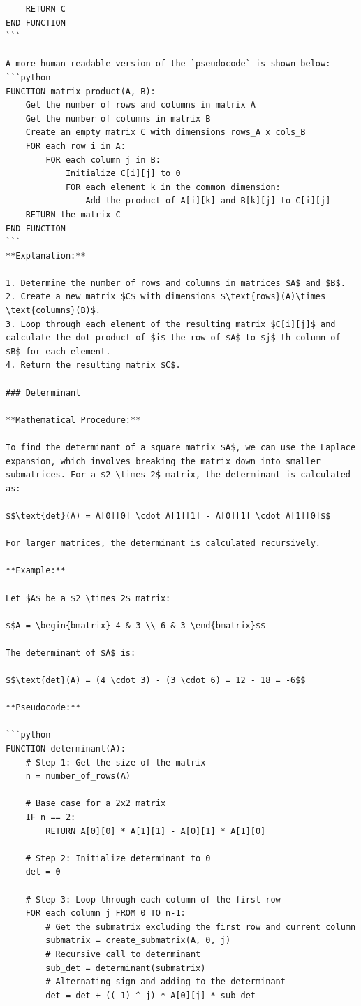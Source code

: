 \documentclass[
  letterpaper,
  DIV=11,
  numbers=noendperiod]{scrreprt}
\theoremstyle{plain}
\theoremstyle{definition}
\theoremstyle{remark}
\begin{document}
\begin{verbatim}
    RETURN C
END FUNCTION
```

A more human readable version of the `pseudocode` is shown below:
```python
FUNCTION matrix_product(A, B):
    Get the number of rows and columns in matrix A
    Get the number of columns in matrix B
    Create an empty matrix C with dimensions rows_A x cols_B
    FOR each row i in A:
        FOR each column j in B:
            Initialize C[i][j] to 0
            FOR each element k in the common dimension:
                Add the product of A[i][k] and B[k][j] to C[i][j]
    RETURN the matrix C
END FUNCTION
```
**Explanation:**

1. Determine the number of rows and columns in matrices $A$ and $B$.
2. Create a new matrix $C$ with dimensions $\text{rows}(A)\times \text{columns}(B)$.
3. Loop through each element of the resulting matrix $C[i][j]$ and calculate the dot product of $i$ the row of $A$ to $j$ th column of $B$ for each element.
4. Return the resulting matrix $C$.

### Determinant

**Mathematical Procedure:**

To find the determinant of a square matrix $A$, we can use the Laplace expansion, which involves breaking the matrix down into smaller submatrices. For a $2 \times 2$ matrix, the determinant is calculated as:

$$\text{det}(A) = A[0][0] \cdot A[1][1] - A[0][1] \cdot A[1][0]$$

For larger matrices, the determinant is calculated recursively.

**Example:**

Let $A$ be a $2 \times 2$ matrix:

$$A = \begin{bmatrix} 4 & 3 \\ 6 & 3 \end{bmatrix}$$

The determinant of $A$ is:

$$\text{det}(A) = (4 \cdot 3) - (3 \cdot 6) = 12 - 18 = -6$$

**Pseudocode:**

```python
FUNCTION determinant(A):
    # Step 1: Get the size of the matrix
    n = number_of_rows(A)
    
    # Base case for a 2x2 matrix
    IF n == 2:
        RETURN A[0][0] * A[1][1] - A[0][1] * A[1][0]
    
    # Step 2: Initialize determinant to 0
    det = 0
    
    # Step 3: Loop through each column of the first row
    FOR each column j FROM 0 TO n-1:
        # Get the submatrix excluding the first row and current column
        submatrix = create_submatrix(A, 0, j)
        # Recursive call to determinant
        sub_det = determinant(submatrix)
        # Alternating sign and adding to the determinant
        det = det + ((-1) ^ j) * A[0][j] * sub_det
    

\end{verbatim}
\end{document}
